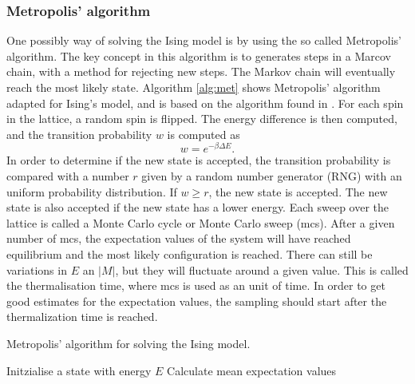 \subsubsection{Metropolis' algorithm}
One possibly way of solving the Ising model is by using the so called Metropolis' algorithm. The key concept in this algorithm is to generates steps in a Marcov chain, with a method for rejecting new steps. The Markov chain will eventually reach the most likely state. Algorithm \ref{alg:met} shows Metropolis' algorithm adapted for Ising's model, and is based on the algorithm found in \cite{lecturenotes}. For each spin in the lattice, a random spin is flipped. The energy difference is then computed, and the transition probability $w$ is computed as
\begin{equation}
w=e^{- \beta \Delta E }.
\end{equation}
In order to determine if the new state is accepted, the transition probability
is compared with a number $r$ given by a random number generator (RNG) with an uniform probability distribution. If $w \geq r$, the new state is accepted. The new state is also accepted if the new state has a lower energy. Each sweep over the lattice is called a Monte Carlo cycle or Monte Carlo sweep (mcs). After a given number of mcs, the expectation values of the system will have reached equilibrium and the most likely configuration is reached. There can still be variations in $E$ an $|M|$, but they will fluctuate around a given value. This is called the thermalisation time, where mcs is used as an unit of time. In order to get good estimates for the expectation values, the sampling should start after the thermalization time is reached. 


\begin{algorithm}[htbp]\label{alg:met}\caption{Metropolis' algorithm for solving the Ising model.}
	\SetAlgoLined
	\BlankLine
	\BlankLine
	Initzialise a state with energy $E$\;
	Calculate mean expectation values\;	
	\BlankLine
	\BlankLine
\end{algorithm}


